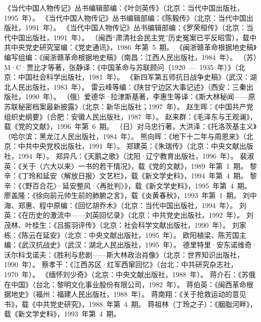 \begin{thebibliography}{999}
\bibitem{}《当代中国人物传记》丛书编辑部编：《叶剑英传》（北京：当代中国出版社，1995~年）。
\bibitem{}《当代中国人物传记》丛书编辑部编：《陈毅传》（北京：当代中国出版社，1991~年）。
\bibitem{}《当代中国人物传记》丛书编辑部编：《罗荣桓传》（北京：当代中国出版社，1991~年）。
\bibitem{}（闽西“肃清社会民主党”历史冤案已平反昭雪），载中共中央党史研究室编：《党史通讯》，1986~年第~5~期。
\bibitem{}《闽浙赣革命根据地史稿》编写组编：《闽浙赣革命根据地史稿》（南昌：江西人民出版社，1984~年）。
\bibitem{}（苏）M·C·贾比才等著，张静译：《中国革命与苏联顾问（1920~—~1935~年）》（北京：中国社会科学出版社，1981~年）。
\bibitem{}《新四军第五师抗日战争史稿》（武汉：湖北人民出版社，1983~年）。
\bibitem{}雷云峰等编：《陕甘宁边区大事记述》（西安：三秦出版社，1990~年）。
\bibitem{}（俄）爱德华·拉津斯基著，李惠生等译：《斯大林秘闻——原苏联秘密档案最新披露》（北京：新华出版社；1997~年）。
\bibitem{}赵生晖：《中国共产党组织史纲要》（合肥：安徽人民出版社，1987~年）。
\bibitem{}赵来群：《毛泽东与王观澜》，载《党的文献》，1996~年第~6~期。
\bibitem{}（日）对马忠行著，大洪泽：《托洛茨基主义》（哈尔滨：黑龙江人民出版社，1984~年）。
\bibitem{}熊向晖：《地下十二年与周恩来》（北京：中共中央党校出版社，1991~年）。
\bibitem{}郑建英：《朱瑞传》（北京：中央文献出版社，1994~年）。
\bibitem{}郑异凡：《天鹅之歌》（沈阳·辽宁教育出版社，1996~年）。
\bibitem{}裴淑英：《关于〈六大以来〉一书的若干情况》，载《党的文献》，1989~年第~1~期。
\bibitem{}黎辛：《丁玲和延安〈解放日报〉文艺栏》，载《新文学史料》，1994~年第~4~期。
\bibitem{}黎辛：《〈野百合花〉·延安整风·〈再批判〉》，载《新文学史料》，1995~年第~4~期。
\bibitem{}廖盖隆：《徐向前元帅生前的肺腑之言》，载《炎黄春秋》，1993~年第~1~期。
\bibitem{}刘中海、郑惠、程中原编：《回忆胡乔木》（北京：当代中国出版社，1994~年）。
\bibitem{}刘英：《在历史的激流中——刘英回忆录》（北京：中共党史出版社，1992~年）。
\bibitem{}刘茂林、叶桂生：《吕振羽评传》（北京：社会科学文献出版社，1990~年）。
\bibitem{}刘家栋：《陈云在延安》（北京：中央文献出版社，1995~年）。
\bibitem{}欧阳植梁、陈芳国主编：《武汉抗战史》（武汉：湖北人民出版社，1995~年）。
\bibitem{}德里特里·安东诺维奇·沃尔科戈诺夫：《胜利与悲剧——斯大林政治肖像》（北京：世界知识出版社，1990~年）。
\bibitem{}蔡孝干：《江西苏区·红军西窜回忆》（台北：中共研究杂志社，1970~年）。
\bibitem{}《缅怀刘少奇》（北京：中央文献出版社，1988~年）。
\bibitem{}蒋介石：《苏俄在中国》（台北：黎明文化事业股份有限公司，1982~年）。
\bibitem{}蒋伯英：《闽西革命根据地史》（福州：福建人民出版社，1988~年）。
\bibitem{}蒋南翔：《关于抢救运动的意见书》，载《中共党史研究》，1988~年第~4~期。
\bibitem{}蒋祖林（丁玲之子）：《胭脂河畔》，载《新文学史料》，1993~年第~4~期。

\end{thebibliography}
